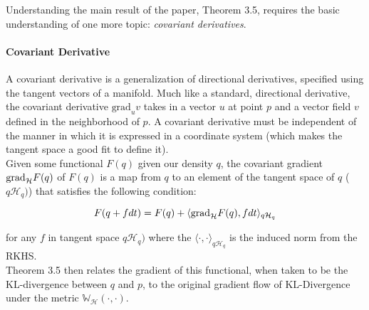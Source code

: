 \documentclass[12pt]{article}
\begin{document}
\noindent Understanding the main result of the paper, Theorem 3.5, requires the basic understanding of one more topic: \textit{covariant derivatives}.

\paragraph{Covariant Derivative} A covariant derivative is a generalization of directional derivatives, specified using the tangent vectors of a manifold. Much like a standard, directional derivative, the covariant derivative $\text{grad}_uv$ takes in a vector $u$ at point $p$ and a vector field $v$ defined in the neighborhood of $p$. A covariant derivative must be independent of the manner in which it is expressed in a coordinate system (which makes the tangent space a good fit to define it). \\ 

\noindent Given some functional $F(q)$ given our density $q$, the covariant gradient $\textup{grad}_\mathcal{H}F(q)$ of $F(q)$ is a map from $q$ to an element of the tangent space of $q$ ($q\mathcal{H}_q)$) that satisfies the following condition:

\begin{equation}
    F(q + fdt) = F(q) + \langle \textup{grad}_\mathcal{H}F(q), fdt \rangle_{q\mathcal{H}_q}
\end{equation}

\noindent for any $f$ in tangent space $q\mathcal{H}_q)$ where the $\langle \cdot, \cdot \rangle_{q\mathcal{H}_q}$ is the induced norm from the RKHS.  \\

\noindent Theorem 3.5 then relates the gradient of this functional, when taken to be the KL-divergence between $q$ and $p$, to the original gradient flow of KL-Divergence under the metric $\mathbb{W}_\mathcal{H}(\cdot, \cdot)$. 

%


\end{document}
